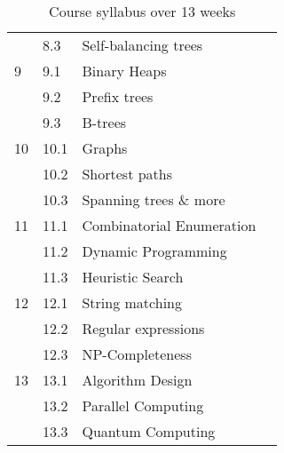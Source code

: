 \begin{table}[p]
\begin{center}
\begin{tabular}{llll}
         & 8.3  & Self-balancing trees      &            \\
    9    & 9.1  & Binary Heaps              &            \\
         & 9.2  & Prefix trees              &            \\
         & 9.3  & B-trees                   &            \\
    \midrule
    10   & 10.1 & Graphs                    &            \\
         & 10.2 & Shortest paths            &            \\
         & 10.3 & Spanning trees \& more    &            \\
    \midrule
    11   & 11.1 & Combinatorial Enumeration &            \\
         & 11.2 & Dynamic Programming       &            \\
         & 11.3 & Heuristic Search          &            \\
    \midrule
    12   & 12.1 & String matching           &            \\
         & 12.2 & Regular expressions       &            \\
         & 12.3 & NP-Completeness           &            \\
    \midrule
    13   & 13.1 & Algorithm Design          &            \\
         & 13.2 & Parallel Computing        &            \\
         & 13.3 & Quantum Computing         &            \\
    \bottomrule
  \end{tabular}
  \end{center}
  \caption{Course syllabus over 13 weeks}
  \label{tab:syllabus}
\end{table}